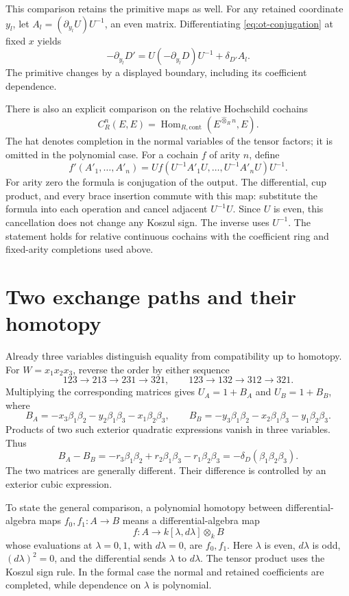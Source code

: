 This comparison retains the primitive maps as well.
For any retained coordinate \(y_l\), let
\(A_l=(\partial_{y_l}U)U^{-1}\), an even matrix.
Differentiating \eqref{eq:ot-conjugation} at fixed \(x\) yields
\[
 -\partial_{y_l}D'
   =U(-\partial_{y_l}D)U^{-1}+\delta_{D'}A_l.
\]
The primitive changes by a displayed boundary, including its
coefficient dependence.

There is also an explicit comparison on the relative Hochschild
cochains
\[
 C_R^n(E,E)=\operatorname{Hom}_{R,\mathrm{cont}}
                     (E^{\widehat\otimes_R n},E).
\]
The hat denotes completion in the normal variables of the tensor
factors; it is omitted in the polynomial case.
For a cochain \(f\) of arity \(n\), define
\[
 f'(A'_1,\ldots,A'_n)
  =U f(U^{-1}A'_1U,\ldots,U^{-1}A'_nU)U^{-1}.
\]
For arity zero the formula is conjugation of the output.
The differential, cup product, and every brace insertion commute
with this map: substitute the formula into each operation and
cancel adjacent \(U^{-1}U\). Since \(U\) is even, this cancellation
does not change any Koszul sign. The inverse uses \(U^{-1}\).
The statement holds for relative continuous cochains with the
coefficient ring and fixed-arity completions used above.

\section{Two exchange paths and their homotopy}
\label{sec:ot-paths}

Already three variables distinguish equality from compatibility
up to homotopy. For \(W=x_1x_2x_3\), reverse the order by
either sequence
\[
 123\longrightarrow213\longrightarrow231\longrightarrow321,
 \qquad
 123\longrightarrow132\longrightarrow312\longrightarrow321.
\]
Multiplying the corresponding matrices gives \(U_A=1+B_A\)
and \(U_B=1+B_B\), where
\[
 B_A=-x_3\beta_1\beta_2-y_2\beta_1\beta_3-x_1\beta_2\beta_3,
 \qquad
 B_B=-y_3\beta_1\beta_2-x_2\beta_1\beta_3-y_1\beta_2\beta_3.
\]
Products of two such exterior quadratic expressions vanish
in three variables. Thus
\[
 B_A-B_B=-r_3\beta_1\beta_2+r_2\beta_1\beta_3-r_1\beta_2\beta_3
        =-\delta_D(\beta_1\beta_2\beta_3).
\]
The two matrices are generally different. Their difference is
controlled by an exterior cubic expression.

To state the general comparison, a polynomial homotopy between
differential-algebra maps \(f_0,f_1:A\to B\) means a
differential-algebra map
\[
 f:A\longrightarrow k[\lambda,d\lambda]\otimes_k B
\]
whose evaluations at \(\lambda=0,1\), with \(d\lambda=0\),
are \(f_0,f_1\). Here \(\lambda\) is even, \(d\lambda\) is odd,
\((d\lambda)^2=0\), and the differential sends \(\lambda\)
to \(d\lambda\). The tensor product uses the Koszul sign rule.
In the formal case the normal and retained coefficients are completed,
while dependence on \(\lambda\) is polynomial.

